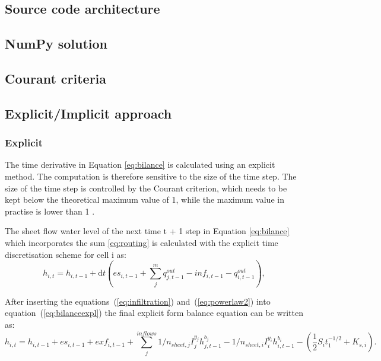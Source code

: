     \subsection{Source code architecture}

    \subsection{NumPy solution}

    \subsection{Courant criteria}

    \subsection{Explicit/Implicit approach}

        \subsubsection{Explicit}
            The time derivative in Equation \ref{eq:bilance} is calculated using an
            explicit method. The computation is therefore sensitive to the size of the time
            step. The size of the time step is controlled by the Courant criterion, which
            needs to be kept below the theoretical maximum value of 1, while the maximum
            value in practise is lower than 1 
            \cite{zhang1989modeling, esteves2000overland}.


            The sheet flow water level of the next time t + 1 step in Equation
            \ref{eq:bilance} which incorporates the sum \ref{eq:routing} is calculated with the
            explicit time discretisation scheme for cell i as:
            \begin{equation} 
            h_{i,t} =h_{i,t-1} + \mathrm{d}t (es_{i,t-1} + \sum_j^m q^{out}_{j,t-1}-
            inf_{i,t-1} - q^{out}_{i,t-1}),
            \label{eq:bilanceexpl}
            \end{equation}


           After inserting the equations~(\ref{eq:infiltration})
           and~(\ref{eq:powerlaw2}) into equation~(\ref{eq:bilanceexpl}) the
           final explicit form balance equation can be written as:
            \begin{dmath}
              h_{i,t} = h_{i,t-1} +
              es_{i,t-1}  + exf_{i,t-1} +  \sum_{j}^{inflows}
              1/n_{sheet,j}I_j^{y_j} h_{j,t-1}^{b_j} -
              1/n_{sheet,i}I_i^{y_i}h_{i,t-1}^{b_i} - ( 
              \frac{1}{2}S_it_1^{-1/2}+K_{s,i}).
            \end{dmath}



